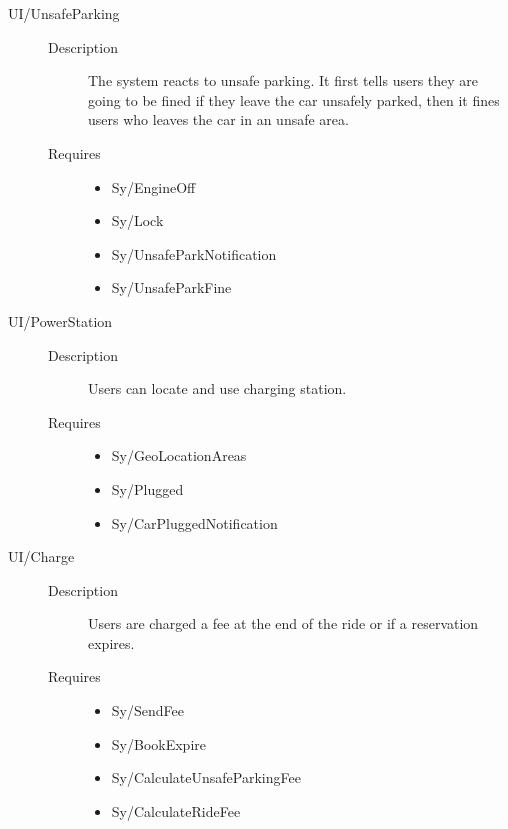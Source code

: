 \documentclass[11pt]{article} %
\begin{document}
\begin{description}
\begin{description}
\begin{itemize}
		\end{itemize}
	\end{description}
	\item[UI/UnsafeParking] \hfill
	\begin{description}
		\item[Description] The system reacts to unsafe parking. It first tells users they are going to be fined if they leave the car unsafely parked, then it fines users who leaves the car in an unsafe area.
		\item[Requires] \hfill
		\begin{itemize}
			\item Sy/EngineOff %
			\item Sy/Lock %
			\item Sy/UnsafeParkNotification %
			\item Sy/UnsafeParkFine
		\end{itemize}
	\end{description}
	\item[UI/PowerStation] \hfill
	\begin{description}
		\item[Description] Users can locate and use charging station.
		\item[Requires] \hfill
		\begin{itemize}
			\item Sy/GeoLocationAreas %
			\item Sy/Plugged %
			\item Sy/CarPluggedNotification %
		\end{itemize}
	\end{description}
	\item[UI/Charge] \hfill
	\begin{description}
		\item[Description] Users are charged a fee at the end of the ride or if a reservation expires.
		\item[Requires] \hfill
		\begin{itemize}
			\item Sy/SendFee %
			\item Sy/BookExpire %
			\item Sy/CalculateUnsafeParkingFee %
			\item Sy/CalculateRideFee 

\end{itemize}
\end{description}
\end{description}
\end{document}
